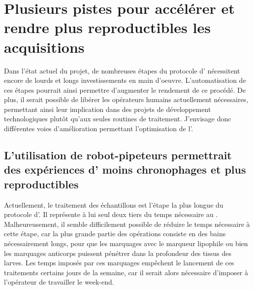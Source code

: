 \documentclass[\main/main.tex]{subfiles}
\begin{document}
          
\section{\label{sec:automatisation}
   Plusieurs pistes pour accélérer et rendre plus reproductibles les acquisitions
    }
 
%   
Dans l'état actuel du projet, de nombreuses étapes du protocole d'\hti{} nécessitent encore de lourds et longs investissements en main d'oeuvre.
%
L'automatisation de ces étapes pourrait ainsi permettre d'augmenter le rendement de ce procédé.
%
De plus, il serait possible de libérer les opérateurs humains actuellement nécessaires,
permettant ainsi leur implication dans des projets de développement technologiques plutôt qu'aux seules routines de traitement.
%
J'envisage donc différentes voies d'amélioration permettant l'optimisation de l'\hti{}.

    \subsection{L'utilisation de robot-pipeteurs permettrait des expériences d'\ihcie{} moins chronophages et plus reproductibles}
    
%
Actuellement, le traitement \ihc{} des échantillons est l'étape la plus longue du protocole d'\hti{}.
%
Il représente à lui seul deux tiers du temps nécessaire au \hcs{}.
%
Malheureusement, il semble difficilement possible de réduire le temps nécessaire à cette étape,
car la plus grande partie des opérations consiste en des bains nécessairement longs,
pour que les marquages avec le marqueur lipophile ou bien les marquages anticorps puissent pénétrer dans la profondeur des tissus des larves.
%
Les temps imposés par ces marquages empêchent le lancement de ces traitements certains jours de la semaine,
car il serait alors nécessaire d'imposer à l'opérateur de travailler le week-end.
\end{document}
